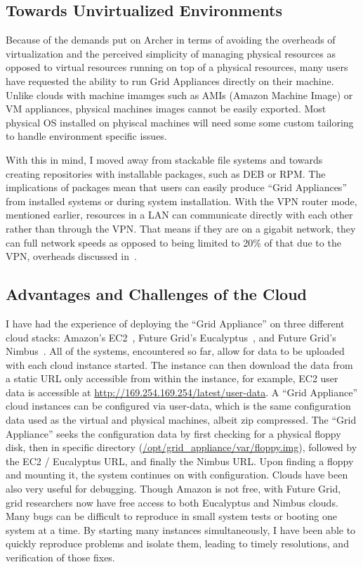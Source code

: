 \subsection{Towards Unvirtualized Environments}
\label{packaging}

Because of the demands put on Archer in terms of avoiding the overheads of
virtualization and the perceived simplicity of managing physical resources as
opposed to virtual resources running on top of a physical resources, many users
have requested the ability to run Grid Appliances directly on their machine.
Unlike clouds with machine imamges such as AMIs (Amazon Machine Image) or VM
appliances, physical machines images cannot be easily exported.  Most physical
OS installed on phyiscal machines will need some some custom tailoring to
handle environment specific issues.

With this in mind, I moved away from stackable file systems and towards
creating repositories with installable packages, such as DEB or RPM.  The
implications of packages mean that users can easily produce ``Grid Appliances''
from installed systems or during system installation.  With the VPN router
mode, mentioned earlier, resources in a LAN can communicate directly with each
other rather than through the VPN.  That means if they are on a gigabit
network, they can full network speeds as opposed to being limited to 20\% of
that due to the VPN, overheads discussed in~\cite{sc09}.

\subsection{Advantages and Challenges of the Cloud}

I have had the experience of deploying the ``Grid Appliance'' on three
different cloud stacks:  Amazon's EC2~\cite{ec2}, Future Grid's
Eucalyptus~\cite{eucalyptus}, and Future Grid's Nimbus~\cite{nimbus}.  All of
the systems, encountered so far, allow for data to be uploaded with each cloud
instance started.  The instance can then download the data from a static URL
only accessible from within the instance, for example, EC2 user data is
accessible at \url{http://169.254.169.254/latest/user-data}. A ``Grid
Appliance'' cloud instances can be configured via user-data, which is the same
configuration data used as the virtual and physical machines, albeit zip
compressed.  The ``Grid Appliance'' seeks the configuration data by first
checking for a physical floppy disk, then in specific directory
(\url{/opt/grid\_appliance/var/floppy.img}), followed by the EC2 / Eucalyptus
URL, and finally the Nimbus URL.  Upon finding a floppy and mounting it, the
system continues on with configuration.  Clouds have been also very useful for
debugging.  Though Amazon is not free, with Future Grid, grid researchers now
have free access to both Eucalyptus and Nimbus clouds.  Many bugs can be
difficult to reproduce in small system tests or booting one system at a time.
By starting many instances simultaneously, I have been able to quickly
reproduce problems and isolate them, leading to timely resolutions, and
verification of those fixes.


